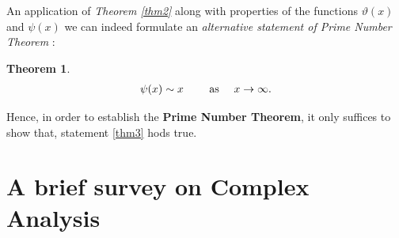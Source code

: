 \documentclass[article,12pt]{elsarticle}
\newtheorem{thm}{Theorem}[section]
\begin{document}
	An application of \textit{Theorem \eqref{thm2}} along with properties of the functions $\vartheta(x)$ and $\psi(x)$ we can indeed formulate an \textit{alternative statement of Prime Number Theorem} :
	\begin{thm}\label{thm3}
		\begin{align}
			\psi(x) \sim x \mbox{\hspace{20pt}  as \hspace{10pt}} x \rightarrow \infty.
		\end{align}  
	\end{thm} 
	Hence, in order to establish the \textbf{Prime Number Theorem}, it only suffices to show that, statement \eqref{thm3} hods true.
	\section{A brief survey on Complex Analysis}
	
\end{document}
